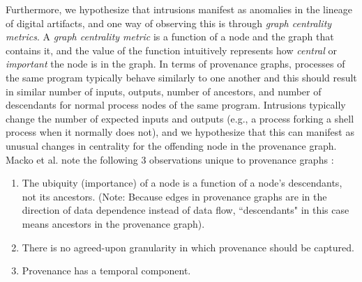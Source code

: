 \documentclass[10pt,twocolumn]{article}
\begin{document}
Furthermore, we hypothesize that intrusions manifest as anomalies in the lineage of digital artifacts, and
one way of observing this is through {\em graph centrality metrics}. A {\em graph centrality metric} is a function
of a node and the graph that contains it, and the value of the function intuitively represents how {\em central} or {\em important} the node
is in the graph. In terms of provenance graphs, processes of the same program typically behave similarly to one another
and this should result in similar number of inputs, outputs, number of ancestors, and number of descendants for normal
process nodes of the same program.
Intrusions typically change the number of expected inputs and outputs (e.g., a process forking a shell process
when it normally does not), and we hypothesize that this can manifest as unusual changes in centrality
for the offending node in the provenance graph. Macko et al. note the following 3 observations unique to provenance graphs \cite{clustering}:
\begin{enumerate}
\item The ubiquity (importance) of a node is a function of a node's descendants, not its ancestors. (Note: Because edges in provenance graphs are in the direction of data dependence instead of data flow, ``descendants" in this case means ancestors in the provenance graph).
\item There is no agreed-upon granularity in which provenance should be captured.
\item Provenance has a temporal component.
\end{enumerate}
\end{document}
